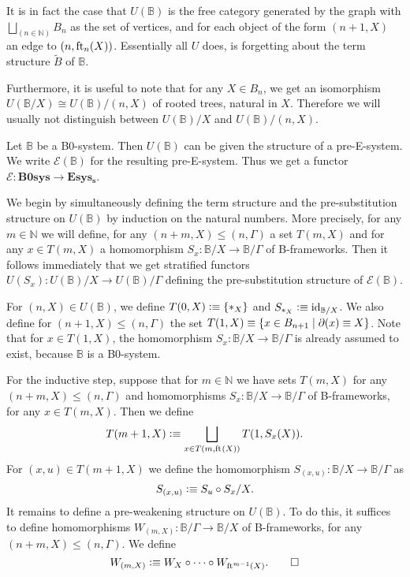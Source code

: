 \begin{rmk} 
It is in fact the case that $U(\mathbb{B})$ is the free category generated by the
graph with $\bigsqcup_{(n\in\mathbb{N})}B_n$ as the set of vertices, and
for each object of the form $(n+1,X)$ an edge to $(n,\eft[n](X))$. 
Essentially all $U$ does, is forgetting about the term structure 
$\tilde{B}$ of $\mathbb{B}$.

Furthermore, it is useful to note that for any $X\in B_n$, we get an 
isomorphism $U(\mathbb{B}/X)\cong  U(\mathbb{B})/(n,X)$ of rooted trees,
natural in $X$. Therefore we will usually not distinguish between $U(\mathbb{B})/X$
and $U(\mathbb{B})/(n,X)$. 
\end{rmk}

\begin{defn}
Let $\mathbb{B}$ be a B0-system. Then $U(\mathbb{B})$ can be given the structure
of a pre-E-system. We write $\mathcal{E}(\mathbb{B})$ for the resulting
pre-E-system. Thus we get a functor $\mathcal{E}:\mathbf{B0sys}\to\mathbf{Esys_s}$.
\end{defn}

\begin{constr}
We begin by simultaneously defining the term structure and the pre-substitution
structure on $U(\mathbb{B})$ by induction on the natural numbers. More precisely,
for any $m\in\mathbb{N}$ we will define, for any $(n+m,X)\leq (n,\Gamma)$ a set
$T(m,X)$ and for any $x\in T(m,X)$ a homomorphism 
$S_x:\mathbb{B}/X\to\mathbb{B}/\Gamma$ of B-frameworks. Then it follows
immediately that we get stratified functors $U(S_x):U(\mathbb{B})/X\to U(\mathbb{B})/\Gamma$
defining the pre-substitution structure of $\mathcal{E}(\mathbb{B})$.

For $(n,X)\in U(\mathbb{B})$, we define $T(0,X)\defeq
\{\pt[X]\}$ and $S_{\pt[X]}\defeq \catid{\mathbb{B}/X}$. We also define for
$(n+1,X)\leq (n,\Gamma)$ the set $T(1,X)\jdeq\{x\in B_{n+1}\mid \ebd(x)\jdeq X\}$.
Note that for $x\in T(1,X)$, the homomorphism $S_x:\mathbb{B}/X \to\mathbb{B}/\Gamma$
is already assumed to exist, because $\mathbb{B}$ is a B0-system.

For the inductive step, suppose that for $m\in\mathbb{N}$ we have sets $T(m,X)$
for any $(n+m,X)\leq (n,\Gamma)$ and homomorphisms $S_x:\mathbb{B}/X \to \mathbb{B}/\Gamma$
of B-frameworks, for any $x\in T(m,X)$. Then we define
\begin{equation*}
T(m+1,X)\defeq\bigsqcup_{x\in T(m,\eft(X))} T(1,S_x(X)).
\end{equation*}
For $(x,u)\in T(m+1,X)$ we define the homomorphism $S_{(x,u)}:\mathbb{B}/X\to
\mathbb{B}/\Gamma$ as
\begin{equation*}
S_{(x,u)}\defeq S_u\circ S_x/X.
\end{equation*}
It remains to define a pre-weakening structure on $U(\mathbb{B})$. To do this,
it suffices to define homomorphisms $W_{(m,X)}:\mathbb{B}/\Gamma \to\mathbb{B}/X$
of B-frameworks, for any $(n+m,X)\leq (n,\Gamma)$. We define
\begin{equation*}
W_{(m,X)}\defeq W_X\circ\cdots\circ W_{\eft^{m-1}(X)}.\qedhere
\end{equation*}
\end{constr}

